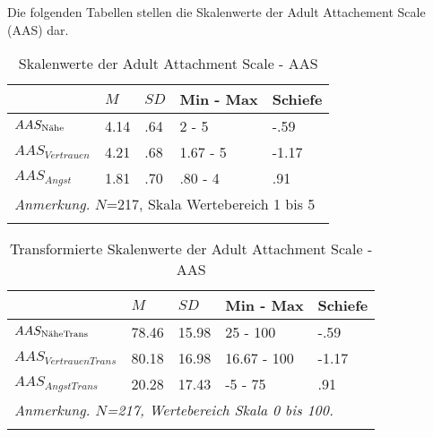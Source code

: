 Die folgenden Tabellen stellen die Skalenwerte der Adult Attachement Scale (AAS) dar.

\begin{table}%
\begin{tabular}{m{6em} m{3em}  m{3em}  m{5em} m{3em}} 
  \hline
  & $M$ & $SD$ & Min - Max & Schiefe\\
  \hline
  $AAS_{\textnormal{Nähe}}$ & 4.14 & .64 & 2 - 5 & -.59\\
  $AAS_{Vertrauen}$ & 4.21 & .68 & 1.67 - 5 & -1.17\\
  $AAS_{Angst}$ & 1.81 & .70 & .80 - 4 & .91 \\
  \hline
  \multicolumn{5}{l}{\textit{Anmerkung.} $N$=217, Skala Wertebereich 1 bis 5}\\
  &&&&\\
\end{tabular}
\caption{Skalenwerte der Adult Attachment Scale - AAS}
\label{table:AppAASDeskriptiv}
\end{table}

\begin{table}%
\begin{tabular}{m{7em} m{3em}  m{3em}  m{5em} m{3em}} 
  \hline
  & $M$ & $SD$ & Min - Max & Schiefe\\
  \hline
  $AAS_{\textit{\textnormal{NäheTrans}}}$ & 78.46 & 15.98 & 25 - 100 & -.59\\
  $AAS_{VertrauenTrans}$ & 80.18 & 16.98 & 16.67 - 100 & -1.17\\
  $AAS_{AngstTrans}$ & 20.28 & 17.43 & -5 - 75 & .91 \\
  \hline
  \multicolumn{5}{l}{\textit{Anmerkung. $N$=217, Wertebereich Skala 0 bis 100.}}\\
  &&&&\\
\end{tabular}
\caption{Transformierte Skalenwerte der Adult Attachment Scale - AAS}
\label{table:AppAASDeskriptivTrans}
\end{table}